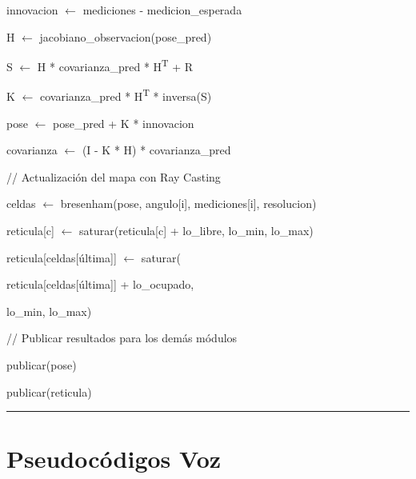 \begin{algorithmic}[1]
    \State innovacion $\gets$
    mediciones - medicion\_esperada

    \State H $\gets$
    jacobiano\_observacion(pose\_pred)

    \State S $\gets$
    H * covarianza\_pred * H\textsuperscript{T} + R

    \State K $\gets$
    covarianza\_pred * H\textsuperscript{T} * inversa(S)

    \State pose $\gets$
    pose\_pred + K * innovacion

    \State covarianza $\gets$
    (I - K * H) * covarianza\_pred

    \Statex

    \Statex \hspace{0.5cm}
    // Actualización del mapa con Ray Casting


        \State celdas $\gets$
        bresenham(pose, angulo[i], mediciones[i], resolucion)


            \State reticula[c] $\gets$
            saturar(reticula[c] + lo\_libre, lo\_min, lo\_max)

        \EndFor


            \State reticula[celdas[última]] $\gets$
            saturar(

            \Statex \hspace{2.2cm}
            reticula[celdas[última]] + lo\_ocupado,

            \Statex \hspace{2.2cm}
            lo\_min, lo\_max)

        \EndIf

    \EndFor

    \Statex

    \Statex \hspace{0.5cm}
    // Publicar resultados para los demás módulos

    \State publicar(pose)

    \State publicar(reticula)

\EndWhile
\end{algorithmic}
\vspace{-0.9cm}
\rule{\textwidth}{0.4pt}

\section{Pseudocódigos Voz}

